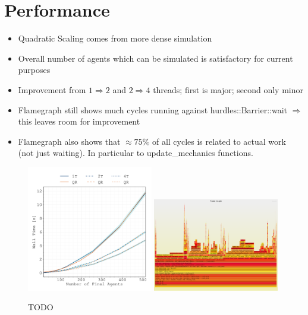 \documentclass{article}
\begin{document}
\section{Performance}

\begin{itemize}
    \item Quadratic Scaling comes from more dense simulation
    \item Overall number of agents which can be simulated is satisfactory for current purposes
    \item Improvement from $1 \Rightarrow 2$ and $2\Rightarrow4$ threads; first is major; second
        only minor
    \item Flamegraph still shows much cycles running against hurdles::Barrier::wait $\Rightarrow$
        this leaves room for improvement
    \item Flamegraph also shows that $\approx 75\%$ of all cycles is related to actual work (not
        just waiting).
        In particular to update\_mechanics functions.
\end{itemize}

\begin{figure}[H]
    \centering
    \includegraphics[width=0.49\textwidth]
        {docs/source/_static/performance/computation-time-with-initial-agents.pdf}
    \includegraphics[width=0.49\textwidth]{docs/source/_static/performance/flamegraph.pdf}
    \caption{TODO}
    \label{fig:performance}
\end{figure}
\end{document}
